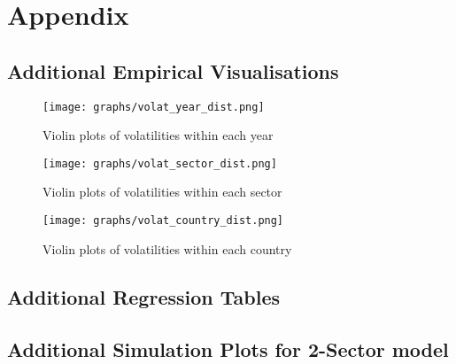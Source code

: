 \section{Appendix}

\subsection{Additional Empirical Visualisations}
\label{sec:add_viz}

\begin{figure}[H]
    \texttt{[image: graphs/volat\_year\_dist.png]}
    \caption{\label{fig:year_violin} Violin plots of volatilities within each year}
\end{figure}

\begin{figure}[H]
    \texttt{[image: graphs/volat\_sector\_dist.png]}
    \caption{\label{fig:sector_violin} Violin plots of volatilities within each sector}
\end{figure}

\begin{figure}[H]
    \texttt{[image: graphs/volat\_country\_dist.png]}
    \caption{\label{fig:country_violin} Violin plots of volatilities within each country}
\end{figure}

\subsection{Additional Regression Tables}
\label{sec:add_reg}












\subsection{Additional Simulation Plots for 2-Sector model}
\label{sec:1x2_sim}


